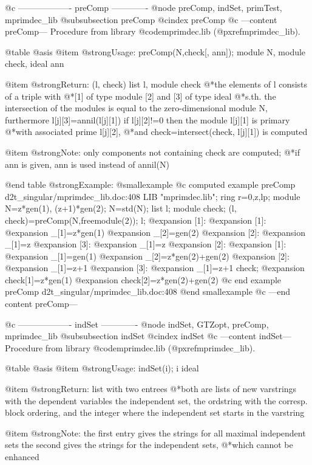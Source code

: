 @c ------------------- preComp -------------
@node preComp, indSet, primTest, mprimdec_lib
@subsubsection preComp
@cindex preComp
@c ---content preComp---
Procedure from library @code{mprimdec.lib} (@pxref{mprimdec_lib}).

@table @asis
@item @strong{Usage:}
preComp(N,check[, ann]); module N, module check, ideal ann

@item @strong{Return:}
(l, check) list l, module check
@*the elements of l consists of a triple with
@*[1] of type module [2] and [3] of type ideal
@*s.th. the intersection of the modules is equal to the
zero-dimensional module N, furthermore l[j][3]=annil(l[j][1])
if l[j][2]!=0 then the module l[j][1] is primary
@*with associated prime l[j][2],
@*and check=intersect(check, l[j][1]) is computed

@item @strong{Note:}
only components not containing check are computed;
@*if ann is given, ann is used instead of annil(N)

@end table
@strong{Example:}
@smallexample
@c computed example preComp d2t_singular/mprimdec_lib.doc:408 
LIB "mprimdec.lib";
ring r=0,z,lp;
module N=z*gen(1), (z+1)*gen(2);
N=std(N);
list l; module check;
(l, check)=preComp(N,freemodule(2));
l;
@expansion{} [1]:
@expansion{}    [1]:
@expansion{}       _[1]=z*gen(1)
@expansion{}       _[2]=gen(2)
@expansion{}    [2]:
@expansion{}       _[1]=z
@expansion{}    [3]:
@expansion{}       _[1]=z
@expansion{} [2]:
@expansion{}    [1]:
@expansion{}       _[1]=gen(1)
@expansion{}       _[2]=z*gen(2)+gen(2)
@expansion{}    [2]:
@expansion{}       _[1]=z+1
@expansion{}    [3]:
@expansion{}       _[1]=z+1
check;
@expansion{} check[1]=z*gen(1)
@expansion{} check[2]=z*gen(2)+gen(2)
@c end example preComp d2t_singular/mprimdec_lib.doc:408
@end smallexample
@c ---end content preComp---

@c ------------------- indSet -------------
@node indSet, GTZopt, preComp, mprimdec_lib
@subsubsection indSet
@cindex indSet
@c ---content indSet---
Procedure from library @code{mprimdec.lib} (@pxref{mprimdec_lib}).

@table @asis
@item @strong{Usage:}
indSet(i); i ideal

@item @strong{Return:}
list with two entrees
@*both are lists of new varstrings with the dependent variables
the independent set, the ordstring with the corresp. block ordering,
and the integer where the independent set starts in the varstring

@item @strong{Note:}
the first entry gives the strings for all maximal independent sets
the second gives the strings for the independent sets,
@*which cannot be enhanced

